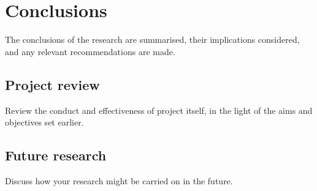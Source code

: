 \chapter{Conclusions}
The conclusions of the research are summarised, their implications considered, and any relevant recommendations are made. 

\section{Project review}
Review the conduct and effectiveness of project itself, in the light of the aims and objectives set earlier.

\section{Future research}
Discuss how your research might be carried on in the future.
